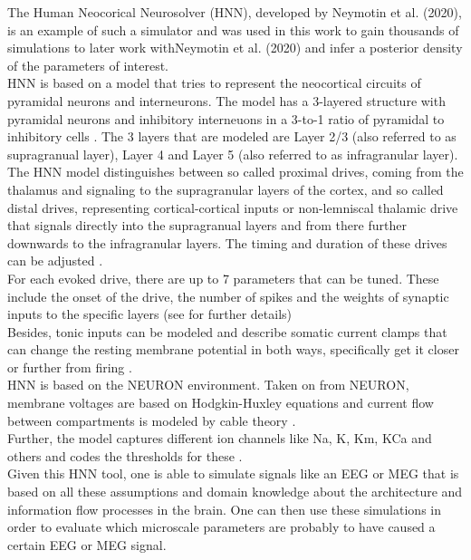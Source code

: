 \documentclass[12pt]{report}
\begin{document}
The Human Neocorical Neurosolver (HNN), developed by Neymotin et al. (2020), is an example of such a simulator and was used in this work to gain thousands of simulations to later work withNeymotin et al. (2020) and infer a posterior density of the parameters of interest. \\
HNN is based on a model that tries to represent the neocortical circuits of pyramidal neurons and interneurons. The model has a 3-layered structure with pyramidal neurons and inhibitory interneuons in a 3-to-1 ratio of pyramidal to inhibitory cells \citep{neymotin2020human}. The 3 layers that are modeled are Layer 2/3 (also referred to as supragranual layer), Layer 4 and Layer 5 (also referred to as infragranular layer). \\
The HNN model distinguishes between so called proximal drives, coming from the thalamus and signaling to the supragranular layers of the cortex, and so called distal drives, representing cortical-cortical inputs or non-lemniscal thalamic drive that signals directly into the supragranual layers and from there further downwards to the infragranular layers. The timing and duration of these drives can be adjusted \citep{neymotin2020human}. \\
For each evoked drive, there are up to 7 parameters that can be tuned. These include the onset of the drive, the number of spikes and the weights of synaptic inputs to the specific layers (see \cite{neymotin2020human} for further details)\\
Besides, tonic inputs can be modeled and describe somatic current clamps that can change the resting membrane potential in both ways, specifically get it closer or further from firing \citep{neymotin2020human}. \\


HNN is based on the NEURON environment. Taken on from NEURON, membrane voltages are based on Hodgkin-Huxley equations and current flow between compartments is modeled by cable theory \citep{neymotin2020human}. \\
Further, the model captures different ion channels like Na, K, Km, KCa and others and codes the thresholds for these \citep{neymotin2020human}. \\

Given this HNN tool, one is able to simulate signals like an EEG or MEG that is based on all these assumptions and domain knowledge about the architecture and information flow processes in the brain. 
One can then use these simulations in order to evaluate which microscale parameters are probably to have caused a certain EEG or MEG signal. \\
\end{document}
